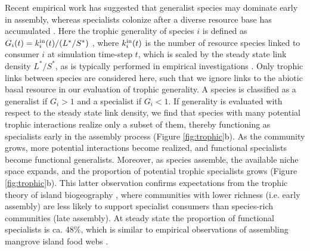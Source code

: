 \documentclass[twocolumn,preprintnumbers,amsmath,amssymb,superscriptaddress,linenumbers]{revtex4-1}
\begin{document}
Recent empirical work has suggested that generalist species may dominate early in assembly, whereas specialists colonize after a diverse resource base has accumulated \cite{Piechnik2008,Gravel2011}.
Here the trophic generality of species $i$ is defined as $G_i(t) = k_i^{\rm in}(t)/(L^*/S^*)$ \cite{Williams2000}, where $k_i^{\rm in}(t)$ is the number of resource species linked to consumer $i$ at simulation time-step $t$, which is scaled by the steady state link density $L^*/S^*$, as is typically performed in empirical investigations \cite{Piechnik2008}.
Only trophic links between species are considered here, such that we ignore links to the abiotic basal resource in our evaluation of trophic generality.
A species is classified as a generalist if $G_i > 1$ and a specialist if $G_i < 1$.
If generality is evaluated with respect to the steady state link density, we find that species with many potential trophic interactions realize only a subset of them, thereby functioning as specialists early in the assembly process (Figure \ref{fig:trophic}b).
As the community grows, more potential interactions become realized, and functional specialists become functional generalists.
Moreover, as species assemble, the available niche space expands, and the proportion of potential trophic specialists grows (Figure \ref{fig:trophic}b).
This latter observation confirms expectations from the trophic theory of island biogeography \cite{Gravel2011}, where communities with lower richness (i.e. early assembly) are less likely to support specialist consumers than species-rich communities (late assembly).
At steady state the proportion of functional specialists is ca. 48\%, which is similar to empirical observations of assembling mangrove island food webs \cite{Piechnik2008}.
\end{document}
